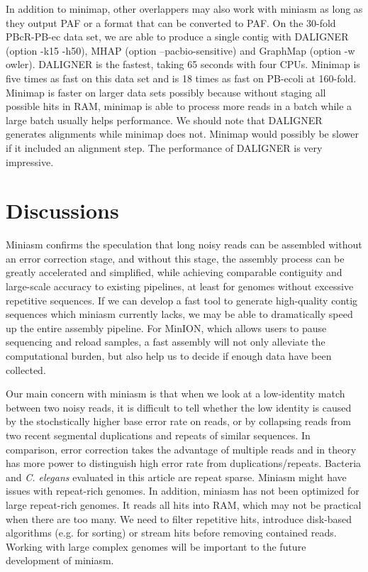\documentclass{bioinfo}
\begin{document}
In addition to minimap, other overlappers may also work with miniasm as long as
they output PAF or a format that can be converted to PAF.  On the 30-fold
PBcR-PB-ec data set, we are able to produce a single contig with DALIGNER
(option -k15 -h50), MHAP (option \mbox{--pacbio-sensitive}) and GraphMap
(option -w owler). DALIGNER is the fastest, taking 65 seconds with four CPUs.
Minimap is five times as fast on this data set and is 18 times as fast on
PB-ecoli at 160-fold. Minimap is faster on larger data sets possibly because
without staging all possible hits in RAM, minimap is able to process more reads
in a batch while a large batch usually helps performance. We should note that
DALIGNER generates alignments while minimap does not. Minimap would possibly be
slower if it included an alignment step. The performance of DALIGNER is very
impressive.

\section{Discussions}

Miniasm confirms the speculation that long noisy reads can be assembled without
an error correction stage, and without this stage, the assembly process can be
greatly accelerated and simplified, while achieving comparable contiguity and
large-scale accuracy to existing pipelines, at least for genomes without
excessive repetitive sequences. If we can develop a fast tool to generate
high-quality contig sequences which miniasm currently lacks, we may be able to
dramatically speed up the entire assembly pipeline. For MinION, which allows
users to pause sequencing and reload samples, a fast assembly will not only
alleviate the computational burden, but also help us to decide if enough data
have been collected.

Our main concern with miniasm is that when we look at a low-identity match
between two noisy reads, it is difficult to tell whether the low identity is
caused by the stochstically higher base error rate on reads, or by collapsing
reads from two recent segmental duplications and repeats of similar sequences. 
In comparison, error correction takes the advantage of multiple reads and in
theory has more power to distinguish high error rate from duplications/repeats.
Bacteria and {\it C. elegans} evaluated in this article are repeat sparse.
Miniasm might have issues with repeat-rich genomes.  In addition, miniasm has
not been optimized for large repeat-rich genomes. It reads all hits into RAM,
which may not be practical when there are too many. We need to filter
repetitive hits, introduce disk-based algorithms (e.g. for sorting) or stream
hits before removing contained reads. Working with large complex genomes will
be important to the future development of miniasm.
\end{document}
